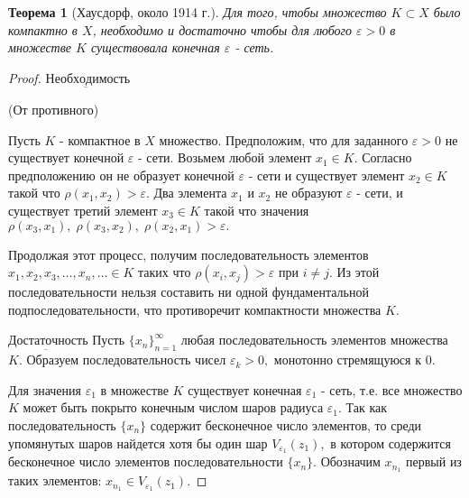 \documentclass[12pt,a4paper,titlepage, oneside]{book}
\theoremstyle{definition}
\theoremstyle{plain}
\newtheorem*{theorem}{Теорема}
\theoremstyle{remark}
\theoremstyle{remark}
\theoremstyle{remark}
\theoremstyle{plain}
\theoremstyle{plain}
\begin{document}
\begin{theorem}[Хаусдорф, около 1914 г.]
Для того, чтобы множество $K \subset X$ было компактно в $X$, необходимо и достаточно чтобы для любого $\varepsilon > 0$ в множестве $K$ существовала конечная $\varepsilon$ \-- сеть. 
\end{theorem}
\begin{proof}

$\underbar{Необходимость}$

(От противного)

Пусть $K$  \-- компактное в $X$ множество. Предположим, что для заданного $\varepsilon >0 $ не существует конечной $\varepsilon$ \-- сети. Возьмем любой элемент $x_1 \in K.$ Согласно предположению он не образует конечной $\varepsilon$ \-- сети и существует элемент $x_2 \in K$ такой что $\rho(x_1, x_2) > \varepsilon.$ Два элемента $x_1$ и $x_2$ не образуют $\varepsilon$ \-- сети, и существует третий элемент $x_3 \in K$ такой что значения $\rho(x_3, x_1), \; \rho(x_3, x_2), \; \rho(x_2, x_1) > \varepsilon.$

Продолжая этот процесс, получим последовательность элементов $x_1,x_2,x_3, \ldots, x_n, \ldots \in K$ таких что $\rho(x_i, x_j) > \varepsilon$ при   $i \neq j.$ Из этой последовательности нельзя составить ни одной фундаментальной подпоследовательности, что противоречит компактности множества $K.$

$\underbar{Достаточность}$ Пусть $\{x_n\}_{n=1}^{\infty}$ любая последовательность элементов множества $K.$ Образуем последовательность чисел $\varepsilon _k > 0,$ монотонно стремящуюся к $0.$

Для значения $\varepsilon _1$  в множестве $K$ существует конечная $\varepsilon _1$ \-- сеть, т.е. все множество $K$ может быть покрыто конечным числом шаров радиуса $\varepsilon _1 .$ Так как последовательность $\{ x_n \}$ содержит бесконечное число элементов, то среди упомянутых шаров найдется хотя бы один шар $V_{\varepsilon _1} (z_1),$ в котором содержится бесконечное число элементов последовательности $\{x_n\}.$ Обозначим $x_{n_1}$ первый из таких элементов: $x_{n_1} \in V_{\varepsilon _1} (z_1).$


\end{proof}
\end{document}
